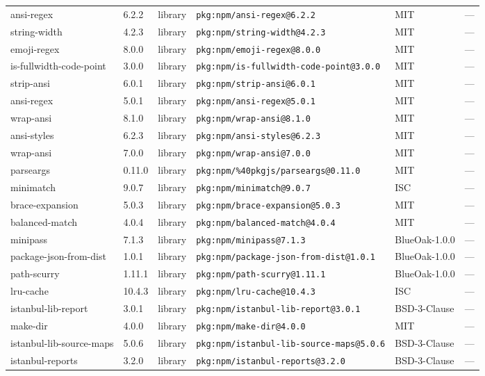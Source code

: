 \documentclass[11pt]{article}
\begin{document}
\begin{longtable}{|l|l|l|p{2.2cm}|l|p{4cm}|}
ansi-regex & 6.2.2 & library & \texttt{pkg:npm/ansi-regex@6.2.2} & MIT & — \\
string-width & 4.2.3 & library & \texttt{pkg:npm/string-width@4.2.3} & MIT & — \\
emoji-regex & 8.0.0 & library & \texttt{pkg:npm/emoji-regex@8.0.0} & MIT & — \\
is-fullwidth-code-point & 3.0.0 & library & \texttt{pkg:npm/is-fullwidth-code-point@3.0.0} & MIT & — \\
strip-ansi & 6.0.1 & library & \texttt{pkg:npm/strip-ansi@6.0.1} & MIT & — \\
ansi-regex & 5.0.1 & library & \texttt{pkg:npm/ansi-regex@5.0.1} & MIT & — \\
wrap-ansi & 8.1.0 & library & \texttt{pkg:npm/wrap-ansi@8.1.0} & MIT & — \\
ansi-styles & 6.2.3 & library & \texttt{pkg:npm/ansi-styles@6.2.3} & MIT & — \\
wrap-ansi & 7.0.0 & library & \texttt{pkg:npm/wrap-ansi@7.0.0} & MIT & — \\
parseargs & 0.11.0 & library & \texttt{pkg:npm/\%40pkgjs/parseargs@0.11.0} & MIT & — \\
minimatch & 9.0.7 & library & \texttt{pkg:npm/minimatch@9.0.7} & ISC & — \\
brace-expansion & 5.0.3 & library & \texttt{pkg:npm/brace-expansion@5.0.3} & MIT & — \\
balanced-match & 4.0.4 & library & \texttt{pkg:npm/balanced-match@4.0.4} & MIT & — \\
minipass & 7.1.3 & library & \texttt{pkg:npm/minipass@7.1.3} & BlueOak-1.0.0 & — \\
package-json-from-dist & 1.0.1 & library & \texttt{pkg:npm/package-json-from-dist@1.0.1} & BlueOak-1.0.0 & — \\
path-scurry & 1.11.1 & library & \texttt{pkg:npm/path-scurry@1.11.1} & BlueOak-1.0.0 & — \\
lru-cache & 10.4.3 & library & \texttt{pkg:npm/lru-cache@10.4.3} & ISC & — \\
istanbul-lib-report & 3.0.1 & library & \texttt{pkg:npm/istanbul-lib-report@3.0.1} & BSD-3-Clause & — \\
make-dir & 4.0.0 & library & \texttt{pkg:npm/make-dir@4.0.0} & MIT & — \\
istanbul-lib-source-maps & 5.0.6 & library & \texttt{pkg:npm/istanbul-lib-source-maps@5.0.6} & BSD-3-Clause & — \\
istanbul-reports & 3.2.0 & library & \texttt{pkg:npm/istanbul-reports@3.2.0} & BSD-3-Clause & — \\

\end{longtable}
\end{document}
